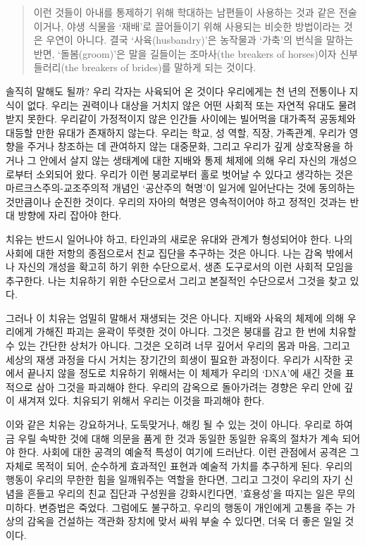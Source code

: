 \documentclass[10pt, b6paper, openany]{memoir}
\begin{document}
\begin{article}
\begin{quote}
이런 것들이 아내를 통제하기 위해 학대하는 남편들이 사용하는 것과 같은 전술이거나, 야생 식물을 `재배'로 끌어들이기 위해 사용되는 비슷한 방법이라는 것은 우연이 아니다. 결국 `사육(husbandry)'은 농작물과 `가축'의 번식을 말하는 반면, `돌봄(groom)'은 말을 길들이는 조마사(the breakers of horses)이자 신부 들러리(the breakers of brides)를 말하게 되는 것이다.
\end{quote}

솔직히 말해도 될까? 우리 각자는 사육되어 온 것이다 우리에게는 천 년의 전통이나 지식이 없다. 우리는 권력이나 대상을 거치지 않은 어떤 사회적 또는 자연적 유대도 물려받지 못한다. 우리같이 가정적이지 않은 인간들 사이에는 빌어먹을 대가족적 공동체와 대등할 만한 유대가 존재하지 않는다. 우리는 학교, 성 역할, 직장, 가족관계, 우리가 영향을 주거나 창조하는 데 관여하지 않는 대중문화, 그리고 우리가 깊게 상호작용을 하거나 그 안에서 살지 않는 생태계에 대한 지배와 통제 체제에 의해 우리 자신의 개성으로부터 소외되어 왔다. 우리가 이런 붕괴로부터 홀로 벗어날 수 있다고 생각하는 것은 마르크스주의-교조주의적 개념인 `공산주의 혁명'이 일거에 일어난다는 것에 동의하는 것만큼이나 순진한 것이다. 우리의 자아의 혁명은 영속적이어야 하고 정적인 것과는 반대 방향에 자리 잡아야 한다. 

치유는 반드시 일어나야 하고, 타인과의 새로운 유대와 관계가 형성되어야 한다. 나의 사회에 대한 저항의 종점으로서 친교 집단을 추구하는 것은 아니다. 나는 감옥 밖에서 나 자신의 개성을 확고히 하기 위한 수단으로서, 생존 도구로서의 이런 사회적 모임을 추구한다. 나는 치유하기 위한 수단으로서 그리고 본질적인 수단으로서 그것을 찾고 있다.

그러나 이 치유는 엄밀히 말해서 재생되는 것은 아니다. 지배와 사육의 체제에 의해 우리에게 가해진 파괴는 윤곽이 뚜렷한 것이 아니다. 그것은 붕대를 감고 한 번에 치유할 수 있는 간단한 상처가 아니다. 그것은 오히려 너무 깊어서 우리의 몸과 마음, 그리고 세상의 재생 과정을 다시 거치는 장기간의 희생이 필요한 과정이다. 우리가 시작한 곳에서 끝나지 않을 정도로 치유하기 위해서는 이 체제가 우리의 ‘DNA’에 새긴 것을 표적으로 삼아 그것을 파괴해야 한다. 우리의 감옥으로 돌아가려는 경향은 우리 안에 깊이 새겨져 있다. 치유되기 위해서 우리는 이것을 파괴해야 한다. 

이와 같은 치유는 강요하거나, 도둑맞거나, 해킹 될 수 있는 것이 아니다. 우리로 하여금 우릴 속박한 것에 대해 의문을 품게 한 것과 동일한 동일한 유혹의 절차가 계속 되어야 한다. 사회에 대한 공격의 예술적 특성이 여기에 드러난다. 이런 관점에서 공격은 그 자체로 목적이 되어, 순수하게 효과적인 표현과 예술적 가치를 추구하게 된다. 우리의 행동이 우리의 무한한 힘을 일깨워주는 역할을 한다면, 그리고 그것이 우리의 자기 신념을 흔들고 우리의 친교 집단과 구성원을 강화시킨다면, '효용성'을 따지는 일은 무의미하다. 변증법은 죽었다. 그럼에도 불구하고, 우리의 행동이 개인에게 고통을 주는 가상의 감옥을 건설하는 객관화 장치에 맞서 싸워 부술 수 있다면, 더욱 더 좋은 일일 것이다. 


\end{article}
\end{document}
